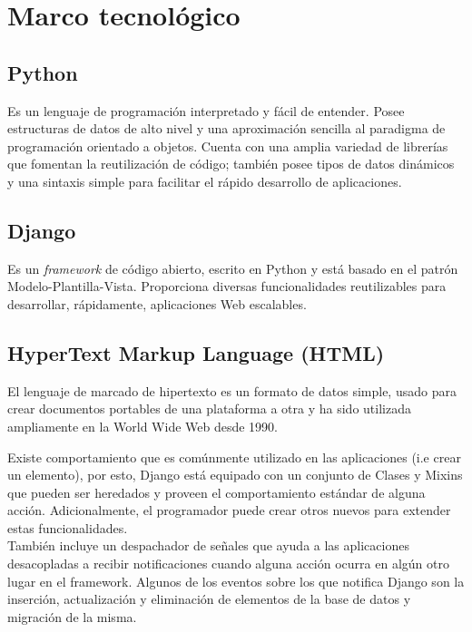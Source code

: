 \chapter{\textbf{Marco tecnológico}}
\thispagestyle{empty}

\section{Python}

Es un lenguaje de programación interpretado y fácil de entender. Posee estructuras de datos de alto nivel y una aproximación sencilla al paradigma de programación orientado a objetos. Cuenta con una amplia variedad de librerías que fomentan la reutilización de código; también posee tipos de datos dinámicos y una sintaxis simple para facilitar el rápido desarrollo de aplicaciones.
 \cite{Python_tutorial}

\section{Django}

Es un \textit{framework} de código abierto, escrito en Python y está basado en el patrón Modelo-Plantilla-Vista. Proporciona diversas funcionalidades reutilizables para desarrollar, rápidamente, aplicaciones Web escalables. \cite{MVT} %

\section{HyperText Markup Language (HTML)}

El lenguaje de marcado de hipertexto es un formato de datos simple, usado para crear documentos portables de una plataforma a otra y ha sido utilizada ampliamente en la World Wide Web desde 1990. \cite{RFC1866}

Existe comportamiento que es comúnmente utilizado en las aplicaciones (i.e crear un elemento), por esto, Django está equipado con un conjunto de Clases y Mixins que pueden ser heredados y proveen el comportamiento estándar de alguna acción. Adicionalmente, el programador puede crear otros nuevos para extender estas funcionalidades.\\

También incluye un despachador de señales que ayuda a las aplicaciones desacopladas a recibir notificaciones cuando alguna acción ocurra en algún otro lugar en el framework. Algunos de los  eventos sobre los que notifica Django son la inserción, actualización y eliminación de elementos de la base de datos y migración de la misma.

